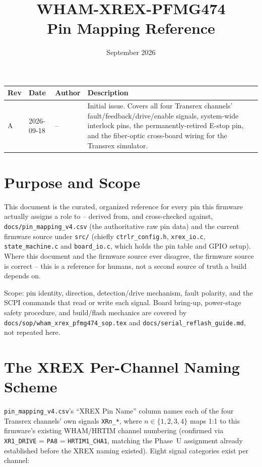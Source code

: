 \documentclass[11pt]{article}
\title{WHAM-XREX-PFMG474\\ \large Pin Mapping Reference}
\author{}
\date{September 2026}
\newcommand{\code}[1]{\texttt{#1}}
\begin{document}
\maketitle

\begin{center}
\begin{tabular}{p{0.45in} p{0.75in} p{0.5in} p{2.7in}}
  \hline
  \textbf{Rev} & \textbf{Date} & \textbf{Author} & \textbf{Description} \\
  \hline
  A & 2026-09-18 & -- & Initial issue. Covers all four Transrex
    channels' fault/feedback/drive/enable signals, system-wide
    interlock pins, the permanently-retired E-stop pin, and the
    fiber-optic cross-board wiring for the Transrex simulator. \\
  \hline
\end{tabular}
\end{center}

\section{Purpose and Scope}
\label{sec:purpose}

This document is the curated, organized reference for every pin this
firmware actually assigns a role to -- derived from, and cross-checked
against, \code{docs/pin\_mapping\_v4.csv} (the authoritative raw pin
data) and the current firmware source under \code{src/} (chiefly
\code{ctrlr\_config.h}, \code{xrex\_io.c}, \code{state\_machine.c} and
\code{board\_io.c}, which holds the pin table and GPIO setup). Where
this document and the firmware source
ever disagree, the firmware source is correct -- this is a reference
for humans, not a second source of truth a build depends on.

Scope: pin identity, direction, detection/drive mechanism, fault
polarity, and the SCPI commands that read or write each signal. Board
bring-up, power-stage safety procedure, and build/flash mechanics are
covered by \code{docs/sop/wham\_xrex\_pfmg474\_sop.tex} and
\code{docs/serial\_reflash\_guide.md}, not repeated here.

\section{The XREX Per-Channel Naming Scheme}
\label{sec:xrex-naming}

\code{pin\_mapping\_v4.csv}'s ``XREX Pin Name'' column names each of
the four Transrex channels' own signals \code{XR\emph{n}\_*}, where
$n \in \{1,2,3,4\}$ maps 1:1 to this firmware's existing WHAM/HRTIM
channel numbering (confirmed via \code{XR1\_DRIVE} = \code{PA8} =
\code{HRTIM1\_CHA1}, matching the Phase~U assignment already
established before the XREX naming existed). Eight signal categories
exist per channel:
\end{document}
